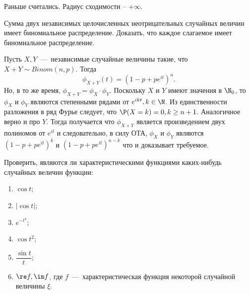 \begin{solution}
    Раньше считались. Радиус сходимости -- $+\infty$.
\end{solution}
\begin{problem}
    Сумма двух независимых целочисленных неотрицательных случайных величин имеет биномиальное распределение.
    Доказать, что каждое слагаемое имеет биномиальное распределение.
\end{problem}
\begin{solution}
    Пусть $X, Y$~---~независимые случайные величины такие, что $X + Y \sim Binom(n, p)$. Тогда
    \[
        \phi_{X + Y}(t) = (1 - p + pe^{it})^n.
    \]
    Но, в то же время, $\phi_{X + Y} = \phi_X \cdot \phi_Y$.
    Поскольку $X$ и $Y$ имеют значения в $\N_0$, то $\phi_X$ и $\phi_Y$ являются степенными рядами от $e^{ikt}, k \in \N$.
    Из единственности разложения в ряд Фурье следует, что $\P(X = k) = 0, k \geq n + 1$.
    Аналогичное верно и про $Y$.
    Тогда получается что $\phi_{X + Y}$ является произведением двух полиномов от $e^{it}$ и следовательно, в силу ОТА, $\phi_X$ и $\phi_Y$ являются $(1 - p + pe^{it})^k$ и $(1 - p + pe^{it})^{n - k}$ что и доказывает требуемое.
\end{solution}
\begin{problem}
    Проверить, являются ли характеристическими функциями каких-нибудь случайных величин функции:
    \begin{enumerate}
        \item $\cos t$;
        \item $|\cos t|$;
        \item $e^{-t^4}$;
        \item $\cos t^2$;
        \item $\dfrac{\sin t}{t}$;
        \item $\re f, \im f$, где $f$~---~характеристическая функция некоторой случайной величины $\xi$.
    \end{enumerate}
\end{problem}
